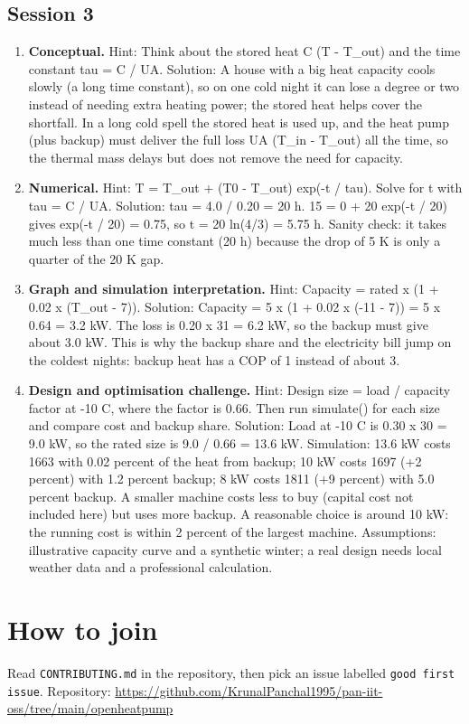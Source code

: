 \documentclass[11pt,a4paper]{article}
\begin{document}
\subsection*{Session 3}
\begin{enumerate}[nosep]
\item \textbf{Conceptual.} Hint: Think about the stored heat C (T - T\_out) and the time constant tau = C / UA. Solution: A house with a big heat capacity cools slowly (a long time constant), so on one cold night it can lose a degree or two instead of needing extra heating power; the stored heat helps cover the shortfall. In a long cold spell the stored heat is used up, and the heat pump (plus backup) must deliver the full loss UA (T\_in - T\_out) all the time, so the thermal mass delays but does not remove the need for capacity.
\item \textbf{Numerical.} Hint: T = T\_out + (T0 - T\_out) exp(-t / tau). Solve for t with tau = C / UA. Solution: tau = 4.0 / 0.20 = 20 h. 15 = 0 + 20 exp(-t / 20) gives exp(-t / 20) = 0.75, so t = 20 ln(4/3) = 5.75 h. Sanity check: it takes much less than one time constant (20 h) because the drop of 5 K is only a quarter of the 20 K gap.
\item \textbf{Graph and simulation interpretation.} Hint: Capacity = rated x (1 + 0.02 x (T\_out - 7)). Solution: Capacity = 5 x (1 + 0.02 x (-11 - 7)) = 5 x 0.64 = 3.2 kW. The loss is 0.20 x 31 = 6.2 kW, so the backup must give about 3.0 kW. This is why the backup share and the electricity bill jump on the coldest nights: backup heat has a COP of 1 instead of about 3.
\item \textbf{Design and optimisation challenge.} Hint: Design size = load / capacity factor at -10 C, where the factor is 0.66. Then run simulate() for each size and compare cost and backup share. Solution: Load at -10 C is 0.30 x 30 = 9.0 kW, so the rated size is 9.0 / 0.66 = 13.6 kW. Simulation: 13.6 kW costs 1663 with 0.02 percent of the heat from backup; 10 kW costs 1697 (+2 percent) with 1.2 percent backup; 8 kW costs 1811 (+9 percent) with 5.0 percent backup. A smaller machine costs less to buy (capital cost not included here) but uses more backup. A reasonable choice is around 10 kW: the running cost is within 2 percent of the largest machine. Assumptions: illustrative capacity curve and a synthetic winter; a real design needs local weather data and a professional calculation.
\end{enumerate}

\section{How to join}
Read \texttt{CONTRIBUTING.md} in the repository, then pick an issue labelled \texttt{good first issue}. Repository: \url{https://github.com/KrunalPanchal1995/pan-iit-oss/tree/main/openheatpump}
\end{document}
